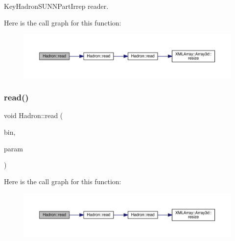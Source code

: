 Key\+Hadron\+S\+U\+N\+N\+Part\+Irrep reader. 

Here is the call graph for this function\+:
\nopagebreak
\begin{figure}[H]
\begin{center}
\leavevmode
\includegraphics[width=350pt]{d1/daf/namespaceHadron_a4cc74936761dd0dad429189f523b1432_cgraph}
\end{center}
\end{figure}
\mbox{\label{namespaceHadron_a7f12085b340a6e0bfb52b3d920cfeb1e}} 
\subsubsection{\texorpdfstring{read()}{read()}\hspace{0.1cm}{\footnotesize\ttfamily [11/94]}}
{\footnotesize\ttfamily void Hadron\+::read (\begin{DoxyParamCaption}\item[{\mbox{\hyperlink{classADATIO_1_1BinaryReader}{Binary\+Reader}} \&}]{bin,  }\item[{\mbox{\hyperlink{structHadron_1_1HadronNptType__t}{Hadron\+Npt\+Type\+\_\+t}} \&}]{param }\end{DoxyParamCaption})}

Here is the call graph for this function\+:
\nopagebreak
\begin{figure}[H]
\begin{center}
\leavevmode
\includegraphics[width=350pt]{d1/daf/namespaceHadron_a7f12085b340a6e0bfb52b3d920cfeb1e_cgraph}
\end{center}
\end{figure}
\mbox{\label{namespaceHadron_aaef0a2bed7d8dd73e0611d46f68b4ee6}} 
